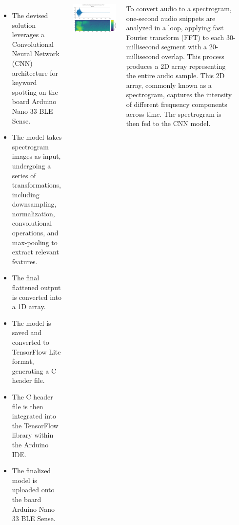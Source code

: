 \documentclass[25pt,a0paper, portrait]{tikzposter}
\begin{document}
\begin{columns}
{		}
		
		
		
		{
			\begin{itemize}
				\item The devised solution leverages a Convolutional Neural Network (CNN) architecture for keyword spotting on the board Arduino Nano 33 BLE Sense.
				\item The model takes spectrogram images as input, undergoing a series of transformations, including downsampling, normalization, convolutional operations, and max-pooling to extract relevant features.
				\item The final flattened output is converted into a 1D array.
				\item The model is saved and converted to TensorFlow Lite format, generating a C header file.
				\item The C header file is then integrated into the TensorFlow library within the Arduino IDE.
				\item The finalized model is uploaded onto the board Arduino Nano 33 BLE Sense.
			\end{itemize}
			
			
		}
		
		{
			\begin{tikzfigure}
				
				\includegraphics[width=\linewidth]{images/audioWaveSpectrogramYes}
				
			\end{tikzfigure}
			
		    To convert audio to a spectrogram, one-second audio snippets are analyzed in a loop, applying fast Fourier transform (FFT) to each 30-millisecond segment with a 20-millisecond overlap. This process produces a 2D array representing the entire audio sample. This 2D array, commonly known as a spectrogram, captures the intensity of different frequency components across time. The spectrogram is then fed to the CNN model.
		
}
\end{columns}
\end{document}
